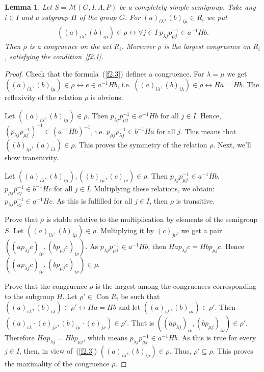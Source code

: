 \documentclass{birkau}
\numberwithin{equation}{section}
\theoremstyle{plain}
\newtheorem{lemma}[theorem]{Lemma}
\theoremstyle{definition}
\DeclareMathOperator{\Con}{Con}
\begin{document}
	\begin{lemma} \label{l2.5}
		Let $S = \mathcal{M}(G,I,\Lambda,P)$ be a completely simple semigroup. Take any $i \in I$ and a subgroup $H$ of the group $G$. For $(a)_{i \lambda},(b)_{i \mu} \in R_i$ we put
		\begin{gather}
			((a)_{i \lambda},(b)_{i \mu}) \in \rho \leftrightarrow \forall j \in I \ p_{\lambda j} p_{\mu j}^{-1} \in a^{-1} H b. \label{f2.3}
		\end{gather}
		Then $\rho$ is a congruence on the act $R_i$. Moreover $\rho$ is the largest congruence on $R_i$, satisfying the condition~\eqref{f2.1}.
	\end{lemma}
	\begin{proof}
		Check that the formula~(\ref{f2.3}) defines a congruence. For $\lambda = \mu$ we get $((a)_{i \lambda},(b)_{i \mu}) \in \rho \leftrightarrow e \in a^{-1} H b$, i.e. $((a)_{i \lambda},(b)_{i \lambda}) \in \rho \leftrightarrow H a = H b$. The reflexivity of the relation $\rho$ is obvious.
		
		Let $((a)_{i \lambda},(b)_{i \mu}) \in \rho$. Then $p_{\lambda j} p_{\mu j}^{-1} \in a^{-1} H b$ for all $j \in I$. Hence, $(p_{\lambda j} p_{\mu j}^{-1})^{-1} \in (a^{-1} H b)^{-1}$, i.e. $p_{\mu j} p_{\lambda j}^{-1} \in b^{-1} H a$ for all $j$. This means that $((b)_{i \mu},(a)_{i \lambda}) \in \rho$. This proves the symmetry of the relation $\rho$. Next, we'll show transitivity.
		
		Let $((a)_{i \lambda},(b)_{i \mu}),((b)_{i \mu},(c)_{i \nu}) \in \rho$. Then $p_{\lambda j} p_{\mu j}^{-1} \in a^{-1} H b$, $p_{\mu j} p_{\nu j}^{-1} \in b^{-1} H c$ for all $j \in I$. Multiplying these relations, we obtain: $p_{\lambda j} p_{\nu j}^{-1} \in a^{-1} H c$. As this is fulfilled for all $j \in I$, then $\rho$ is transitive.
		
		Prove that $\rho$ is stable relative to the multiplication by elements of the semigroup $S$. Let $((a)_{i \lambda},(b)_{i \mu}) \in \rho$. Multiplying it by $(c)_{j \nu}$, we get a pair $((ap_{\lambda j}c)_{i \nu},(bp_{\mu j}c)_{i \nu})$. As $p_{\lambda j} p_{\mu j}^{-1} \in a^{-1} H b$, then $H a p_{\lambda j} c = H b p_{\mu j} c$. Hence $ \allowbreak ((a p_{\lambda j} c)_{i \nu},(b p_{\mu j} c)_{i \nu}) \in \rho$.
		
		Prove that the congruence $\rho$ is the largest among the congruences corresponding to the subgroup $H$. Let $\rho' \in \Con R_i$ be such that $((a)_{i \lambda},(b)_{i \lambda}) \in \rho' \leftrightarrow H a = H b$ and let $((a)_{i \lambda},(b)_{i \mu}) \in \rho'$. Then $((a)_{i \lambda} \cdot (e)_{j \nu},(b)_{i \mu} \cdot (e)_{j \nu}) \in \rho'$. That is $((a p_{\lambda j})_{i \nu},(b p_{\mu j})_{i \nu}) \in \rho'$. Therefore $H a p_{\lambda j} = H b p_{\mu j}$, which means $p_{\lambda j} p_{\mu j}^{-1} \in a^{-1}H b$. As this is true for every $j \in I$, then, in view of~(\ref{f2.3}) $((a)_{i \lambda},(b)_{i \mu}) \in \rho$. Thus, $\rho' \subseteq \rho$. This proves the maximality of the congruence $\rho$.
	\end{proof}
	
\end{document}
